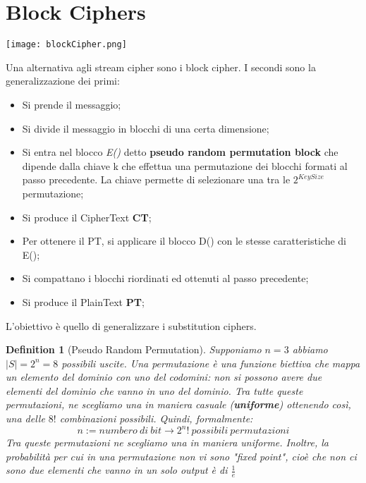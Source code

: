 \documentclass{article}
\newtheorem{definition}{Definition}[section]
\theoremstyle{remark}
\begin{document}
\section{Block Ciphers}
\begin{center}
	\texttt{[image: blockCipher.png]}
\end{center}
Una alternativa agli stream cipher sono i block cipher. I secondi sono la generalizzazione dei primi:
\begin{itemize}
	\item Si prende il messaggio;
	\item Si divide il messaggio in blocchi di una certa dimensione;
	\item Si entra nel blocco \emph{E()} detto \textbf{pseudo random permutation block} che dipende dalla chiave k che effettua una permutazione dei blocchi formati al passo precedente. La chiave permette di selezionare una tra le $2^{KeySize}$ permutazione;
	\item Si produce il CipherText \textbf{CT};
	\item Per ottenere il PT, si applicare il blocco D() con le stesse caratteristiche di E();
	\item Si compattano i blocchi riordinati ed ottenuti al passo precedente;
	\item Si produce il PlainText \textbf{PT};
\end{itemize}
L'obiettivo è quello di generalizzare i substitution ciphers.
\begin{definition}[Pseudo Random Permutation]
	Supponiamo $n=3$ abbiamo $|S|=2^n=8$ possibili uscite. Una permutazione è una funzione biettiva che mappa un elemento del dominio con uno del codomini: non si possono avere due elementi del dominio che vanno in uno del dominio.\newline
	Tra tutte queste permutazioni, ne scegliamo una in maniera casuale (\textbf{uniforme}) ottenendo così, una delle $8!$ combinazioni possibili.
	Quindi, formalmente:
	\begin{equation}
		n:= numbero\ di\ bit \rightarrow 2^{n}!\ possibili\ permutazioni
	\end{equation}
	Tra queste permutazioni ne scegliamo una in maniera uniforme. Inoltre, la probabilità per cui in una permutazione non vi sono "fixed point", cioè che non ci sono due elementi che vanno in un solo output è di $\frac{1}{e}$
\end{definition}
\end{document}
